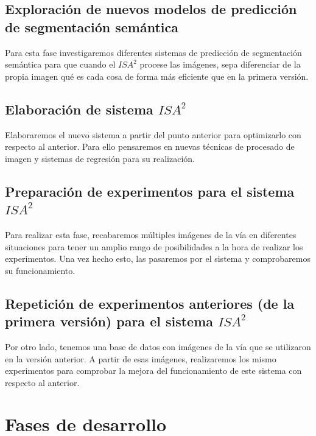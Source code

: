 \documentclass[12pt,oneside,a4paper]{article}
\begin{document}
\subsection{Exploración de nuevos modelos de predicción de segmentación semántica}

Para esta fase investigaremos diferentes sistemas de predicción de segmentación semántica para que cuando el $ISA^2$ procese las imágenes, sepa diferenciar de la propia imagen qué es cada cosa de forma más eficiente que en la primera versión.
\subsection{Elaboración de sistema $ISA^2$}

Elaboraremos el nuevo sistema a partir del punto anterior para optimizarlo con respecto al anterior. Para ello pensaremos en nuevas técnicas de procesado de imagen y sistemas de regresión para su realización.
\subsection{Preparación de experimentos para el sistema $ISA^2$}

Para realizar esta fase, recabaremos múltiples imágenes de la vía en diferentes situaciones para tener un amplio rango de posibilidades a la hora de realizar los experimentos. Una vez hecho esto, las pasaremos por el sistema y comprobaremos su funcionamiento.
\subsection{Repetición de experimentos anteriores (de la primera versión) para el sistema $ISA^2$}

Por otro lado, tenemos una base de datos con imágenes de la vía que se utilizaron en la versión anterior. A partir de esas imágenes, realizaremos los mismo experimentos para comprobar la mejora del funcionamiento de este sistema con respecto al anterior.

\section{Fases de desarrollo}
\end{document}
